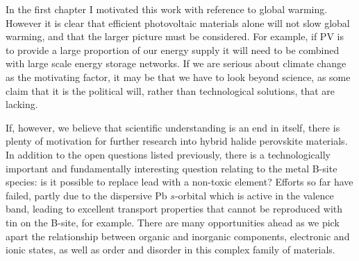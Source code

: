 In the first chapter I motivated this work with reference to global warming. However it is clear that efficient photovoltaic materials alone will not slow global warming, and that the larger picture must be considered. For example, if PV is to provide a large proportion of our energy supply it will need to be combined with large scale energy storage networks. If we are serious about climate change as the motivating factor, it may be that we have to look beyond science, as some claim that it is the political will, rather than technological solutions, that are lacking. 

If, however, we believe that scientific understanding is an end in itself, there is plenty of motivation for further research into hybrid halide perovskite materials. In addition to the open questions listed previously, there is a technologically important and fundamentally interesting question relating to the metal B-site species: is it possible to replace lead with a non-toxic element? Efforts so far have failed, partly due to the dispersive Pb $s$-orbital which is active in the valence band, leading to excellent transport properties that cannot be reproduced with tin on the B-site, for example.
There are many opportunities ahead as we pick apart the relationship between organic and inorganic components, electronic and ionic states, as well as order and disorder in this complex family of materials.



